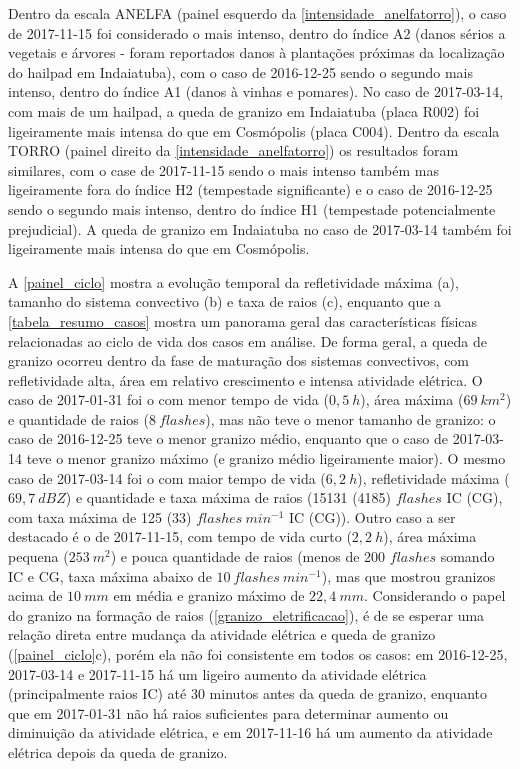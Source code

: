 Dentro da escala ANELFA (painel esquerdo da \autoref{intensidade_anelfatorro}), o caso de 2017-11-15 foi considerado o mais intenso, dentro do índice A2 (danos sérios a vegetais e árvores - foram reportados danos à plantações próximas da localização do hailpad em Indaiatuba), com o caso de 2016-12-25 sendo o segundo mais intenso, dentro do índice A1 (danos à vinhas e pomares). No caso de 2017-03-14, com mais de um hailpad, a queda de granizo em Indaiatuba (placa R002) foi ligeiramente mais intensa do que em Cosmópolis (placa C004). Dentro da escala TORRO (painel direito da \autoref{intensidade_anelfatorro}) os resultados foram similares, com o case de 2017-11-15 sendo o mais intenso também mas ligeiramente fora do índice H2 (tempestade significante) e o caso de 2016-12-25 sendo o segundo mais intenso, dentro do índice H1 (tempestade potencialmente prejudicial). A queda de granizo em Indaiatuba no caso de 2017-03-14 também foi ligeiramente mais intensa do que em Cosmópolis.

A \autoref{painel_ciclo} mostra a evolução temporal da refletividade máxima (a), tamanho do sistema convectivo (b) e taxa de raios (c), enquanto que a \autoref{tabela_resumo_casos} mostra um panorama geral das características físicas relacionadas ao ciclo de vida dos casos em análise. De forma geral, a queda de granizo ocorreu dentro da fase de maturação dos sistemas convectivos, com refletividade alta, área em relativo crescimento e intensa atividade elétrica. O caso de 2017-01-31 foi o com menor tempo de vida ($0,5\:h$), área máxima ($69\:km^2$) e quantidade de raios ($8\:flashes$), mas não teve o menor tamanho de granizo: o caso de 2016-12-25 teve o menor granizo médio, enquanto que o caso de 2017-03-14 teve o menor granizo máximo (e granizo médio ligeiramente maior). O mesmo caso de 2017-03-14 foi o com maior tempo de vida ($6,2\:h$), refletividade máxima ($69,7\:dBZ$) e quantidade e taxa máxima de raios (15131 (4185) $flashes$ IC (CG), com taxa máxima de 125 (33) $flashes\:min^{-1}$ IC (CG)). Outro caso a ser destacado é o de 2017-11-15, com tempo de vida curto ($2,2\:h$), área máxima pequena ($253\:m^2$) e pouca quantidade de raios (menos de 200 $flashes$ somando IC e CG, taxa máxima abaixo de $10\:flashes\:min^{-1}$), mas que mostrou granizos acima de $10\:mm$ em média e granizo máximo de $22,4\:mm$. Considerando o papel do granizo na formação de raios (\autoref{granizo_eletrificacao}), é de se esperar uma relação direta entre mudança da atividade elétrica e queda de granizo (\autoref{painel_ciclo}c), porém ela não foi consistente em todos os casos: em 2016-12-25, 2017-03-14 e 2017-11-15 há um ligeiro aumento da atividade elétrica (principalmente raios IC) até 30 minutos antes da queda de granizo, enquanto que em 2017-01-31 não há raios suficientes para determinar aumento ou diminuição da atividade elétrica, e em 2017-11-16 há um aumento da atividade elétrica depois da queda de granizo.


